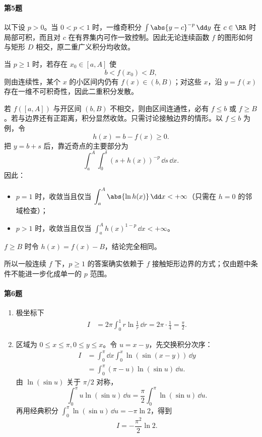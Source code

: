 \paragraph{第5题}
\begin{xsolution}
以下设 $p>0$。当 $0<p<1$ 时，一维奇积分 $\int\abs{y-c}^{-p}\,\dd y$ 在 $c\in\RR$ 时局部可积，而且对 $c$ 在有界集内可作一致控制。因此无论连续函数 $f$ 的图形如何与矩形 $D$ 相交，原二重广义积分均收敛。

当 $p\ge1$ 时，若存在 $x_0\in[a,A]$ 使
\[
 b<f(x_0)<B,
\]
则由连续性，某个 $x$ 的小区间内仍有 $f(x)\in(b,B)$；对这些 $x$，沿 $y=f(x)$ 存在一维不可积奇性，因此二重积分发散。

若 $f([a,A])$ 与开区间 $(b,B)$ 不相交，则由区间连通性，必有 $f\le b$ 或 $f\ge B$。若与边界还有正距离，积分显然收敛。只需讨论接触边界的情形。以 $f\le b$ 为例，令
\[
 h(x)=b-f(x)\ge0.
\]
把 $y=b+s$ 后，靠近奇点的主要部分为
\[
 \int_a^A\int_0^\delta(s+h(x))^{-p}\,\dd s\,\dd x.
\]
因此：
\begin{itemize}
  \item $p=1$ 时，收敛当且仅当 $\displaystyle\int_a^A\abs{\ln h(x)}\,\dd x<+\infty$（只需在 $h=0$ 的邻域检查）；
  \item $p>1$ 时，收敛当且仅当 $\displaystyle\int_a^Ah(x)^{1-p}\,\dd x<+\infty$。
\end{itemize}
$f\ge B$ 时令 $h(x)=f(x)-B$，结论完全相同。

所以一般连续 $f$ 下，$p\ge1$ 的答案确实依赖于 $f$ 接触矩形边界的方式；仅由题中条件不能进一步化成单一的 $p$ 范围。
\end{xsolution}

\paragraph{第6题}
\begin{xsolution}
\begin{enumerate}[label=(\arabic*)]
  \item 极坐标下
  \begin{align*}
   I&=2\pi\int_0^1r\ln\frac1r\,\dd r
   =2\pi\cdot\frac14
   =\boxed{\frac\pi2}.
  \end{align*}

  \item 区域为 $0\le x\le\pi,0\le y\le x$。令 $u=x-y$，先交换积分次序：
  \begin{align*}
   I&=\int_0^\pi\dd x\int_0^x\ln(\sin(x-y))\,\dd y\\
   &=\int_0^\pi(\pi-u)\ln(\sin u)\,\dd u.
  \end{align*}
  由 $\ln(\sin u)$ 关于 $\pi/2$ 对称，
  \[
   \int_0^\pi u\ln(\sin u)\,\dd u
   =\frac\pi2\int_0^\pi\ln(\sin u)\,\dd u.
  \]
  再用经典积分 $\int_0^\pi\ln(\sin u)\,\dd u=-\pi\ln2$，得到
  \[
    \boxed{I=-\frac{\pi^2}{2}\ln2}.
  \]
\end{enumerate}
\end{xsolution}

